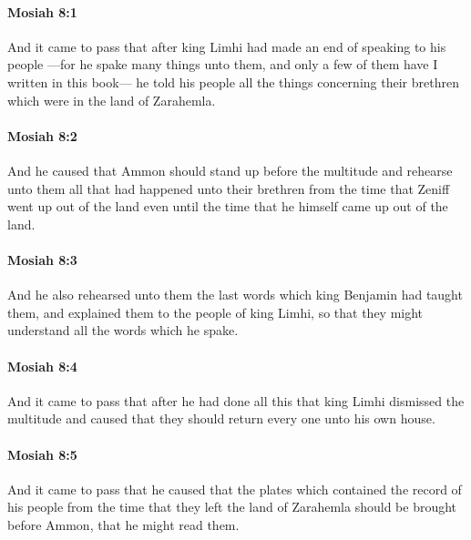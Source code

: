 		\paragraph{Mosiah 8:1} %
			\label{MOSIAH-8-1}

			And it came to pass that
			after king Limhi had made an end of speaking to his people
			---for he spake many things unto them,
			and only a few of them have I written in this book---
			he told his people all the things concerning their brethren
			which were in the land of Zarahemla.

		\paragraph{Mosiah 8:2} %
			\label{MOSIAH-8-2}

			And he caused that Ammon should stand up before the multitude
			and rehearse unto them all that had happened unto their brethren
			from the time that Zeniff went up out of the land
			even until the time that he himself came up out of the land.

		\paragraph{Mosiah 8:3} %
			\label{MOSIAH-8-3}

			And he also rehearsed unto them the last words
			which king Benjamin had taught them,
			and explained them to the people of king Limhi,
			so that they might understand all the words which he spake.

		\paragraph{Mosiah 8:4} %
			\label{MOSIAH-8-4}

			And it came to pass that after he had done all this
			that king Limhi dismissed the multitude
			and caused that they should return every one unto his own house.

		\paragraph{Mosiah 8:5} %
			\label{MOSIAH-8-5}

			And it came to pass that he caused that the plates
			which contained the record of his people
			from the time that they left the land of Zarahemla
			should be brought before Ammon, that he might read them.

